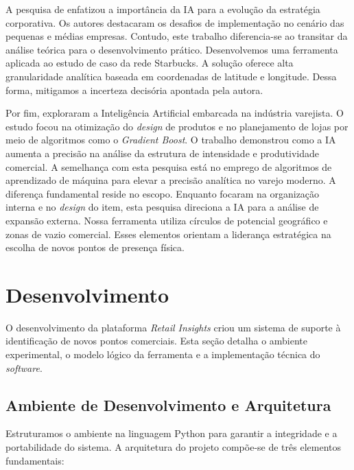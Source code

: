 A pesquisa de  enfatizou a importância da IA para a evolução da estratégia corporativa. Os autores destacaram os desafios de implementação no cenário das pequenas e médias empresas. Contudo, este trabalho diferencia-se ao transitar da análise teórica para o desenvolvimento prático. Desenvolvemos uma ferramenta aplicada ao estudo de caso da rede Starbucks. A solução oferece alta granularidade analítica baseada em coordenadas de latitude e longitude. Dessa forma, mitigamos a incerteza decisória apontada pela autora.

Por fim,  exploraram a Inteligência Artificial embarcada na indústria varejista. O estudo focou na otimização do \textit{design} de produtos e no planejamento de lojas por meio de algoritmos como o \textit{Gradient Boost}. O trabalho demonstrou como a IA aumenta a precisão na análise da estrutura de intensidade e produtividade comercial. A semelhança com esta pesquisa está no emprego de algoritmos de aprendizado de máquina para elevar a precisão analítica no varejo moderno. A diferença fundamental reside no escopo. Enquanto  focaram na organização interna e no \textit{design} do item, esta pesquisa direciona a IA para a análise de expansão externa. Nossa ferramenta utiliza círculos de potencial geográfico e zonas de vazio comercial. Esses elementos orientam a liderança estratégica na escolha de novos pontos de presença física.

\section{\esp Desenvolvimento}

O desenvolvimento da plataforma \textit{Retail Insights} criou um sistema de suporte à identificação de novos pontos comerciais. Esta seção detalha o ambiente experimental, o modelo lógico da ferramenta e a implementação técnica do \textit{software}.

\subsection{\esp Ambiente de Desenvolvimento e Arquitetura}

Estruturamos o ambiente na linguagem Python para garantir a integridade e a portabilidade do sistema. A arquitetura do projeto compõe-se de três elementos fundamentais:


